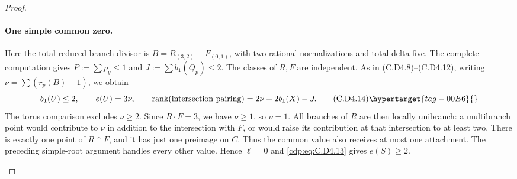 \begin{proof}
\begin{enumerate}[label={$\langle1\rangle$\arabic*.},leftmargin=*]
\paragraph{One simple common zero.}
Here the total reduced branch divisor is
$B=R_{(3,2)}+F_{(0,1)}$, with two rational normalizations
and total delta five. The complete computation 
gives $P:=\sum p_g\le1$ and
$J:=\sum b_1(Q_p)\le2$. The classes of $R,F$ are
independent. As in (C.D4.8)--(C.D4.12), writing
$\nu=\sum(r_p(B)-1)$, we obtain
\[
 b_1(U)\le2,\qquad e(U)=3\nu,\qquad
 \operatorname{rank}(\hbox{intersection pairing})
                         =2\nu+2b_1(X)-J.
\tag{C.D4.14}\hypertarget{tag-00E6}{}\label{cdp:eq:C.D4.14}
\]
The torus comparison excludes $\nu\ge2$. Since $R\cdot F=3$,
we have $\nu\ge1$, so $\nu=1$. All branches of $R$ are
then locally unibranch: a multibranch point would contribute
to $\nu$ in addition to the intersection with $F$, or would
raise its contribution at that intersection to at least two.
There is exactly one point of $R\cap F$, and it has just
one preimage on $C$. Thus the common value also receives
at most one attachment. The preceding simple-root argument
handles every other value. Hence $\ell=0$ and \eqref{cdp:eq:C.D4.13}
gives $e(S)\ge2$.


\end{enumerate}
\end{proof}

